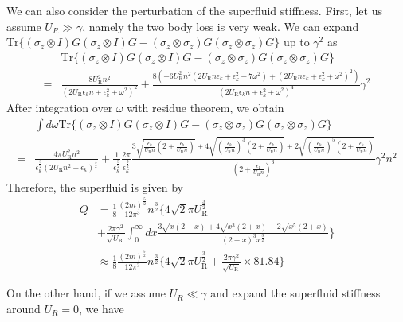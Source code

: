 \documentclass{article}
\begin{document}
We can also consider the perturbation of the superfluid stiffness. First, let us assume $U_R\gg\gamma$, namely the two body loss is very weak. We can expand $\mathrm{Tr}\{(\sigma_{z}\otimes I)G(\sigma_{z}\otimes I)G-(\sigma_{z}\otimes\sigma_{z})G(\sigma_{z}\otimes\sigma_{z})G\}$
up to $\gamma^{2}$ as
\begin{align}
 & \mathrm{Tr}\{(\sigma_{z}\otimes I)G(\sigma_{z}\otimes I)G-(\sigma_{z}\otimes\sigma_{z})G(\sigma_{z}\otimes\sigma_{z})G\}\nonumber \\
= & \frac{8U_{\mathrm{R}}^{2}n^{2}}{(2U_{\mathrm{R}}\epsilon_{k}n+\epsilon_{k}^{2}+\omega^{2})^{2}}+\frac{8(-6U_{\mathrm{R}}^{2}n^{2}(2U_{\mathrm{R}}n\epsilon_{k}+\epsilon_{k}^{2}-7\omega^{2})+(2U_{\mathrm{R}}n\epsilon_{k}+\epsilon_{k}^{2}+\omega^{2})^{2})}{(2U_{\mathrm{R}}\epsilon_{k}n+\epsilon_{k}^{2}+\omega^{2})^{4}}\gamma^{2}
\end{align}
After integration over $\omega$ with residue theorem, we obtain
\begin{align}
 & \int d\omega\mathrm{Tr}\{(\sigma_{z}\otimes I)G(\sigma_{z}\otimes I)G-(\sigma_{z}\otimes\sigma_{z})G(\sigma_{z}\otimes\sigma_{z})G\}\nonumber \\
= & \frac{4\pi U_{\mathrm{R}}^{2}n^{2}}{\epsilon_{k}^{\frac{3}{2}}(2U_{\mathrm{R}}n^{2}+\epsilon_{k})^{\frac{3}{2}}}+\frac{1}{\epsilon_{k}^{\frac{3}{2}}}\frac{2\pi}{\epsilon_{k}^{\frac{3}{2}}}\frac{3\sqrt{\frac{\epsilon_{k}}{U_{\mathrm{R}}n}(2+\frac{\epsilon_{k}}{U_{\mathrm{R}}n})}+4\sqrt{(\frac{\epsilon_{k}}{U_{\mathrm{R}}n})^{3}(2+\frac{\epsilon_{k}}{U_{\mathrm{R}}n})}+2\sqrt{(\frac{\epsilon_{k}}{U_{\mathrm{R}}n})^{5}(2+\frac{\epsilon_{k}}{U_{\mathrm{R}}n})}}{(2+\frac{\epsilon_{k}}{U_{\mathrm{R}}n})^{3}}\gamma^{2}n^{2}
\end{align}
Therefore, the superfluid is given by
\begin{align}
Q & =\frac{1}{8}\frac{(2m)^{\frac{5}{2}}}{12\pi^{3}}n^{\frac{3}{2}}\{4\sqrt{2}\pi U_{\mathrm{R}}^{\frac{3}{2}}\nonumber \\
 & +\frac{2\pi\gamma^{2}}{\sqrt{U_{\mathrm{R}}}}\int_{0}^{\infty}dx\frac{3\sqrt{x(2+x)}+4\sqrt{x^{3}(2+x)}+2\sqrt{x^{5}(2+x)}}{(2+x)^{3}x^{\frac{3}{2}}}\}\\
 & \approx\frac{1}{8}\frac{(2m)^{\frac{5}{2}}}{12\pi^{3}}n^{\frac{3}{2}}\{4\sqrt{2}\pi U_{\mathrm{R}}^{\frac{3}{2}}+\frac{2\pi\gamma^{2}}{\sqrt{U_{\mathrm{R}}}}\times81.84\}
\end{align}

On the other hand, if we assume $U_{R}\ll\gamma$ and expand the superfluid
stiffness around $U_{R}=0$, we have
\end{document}

